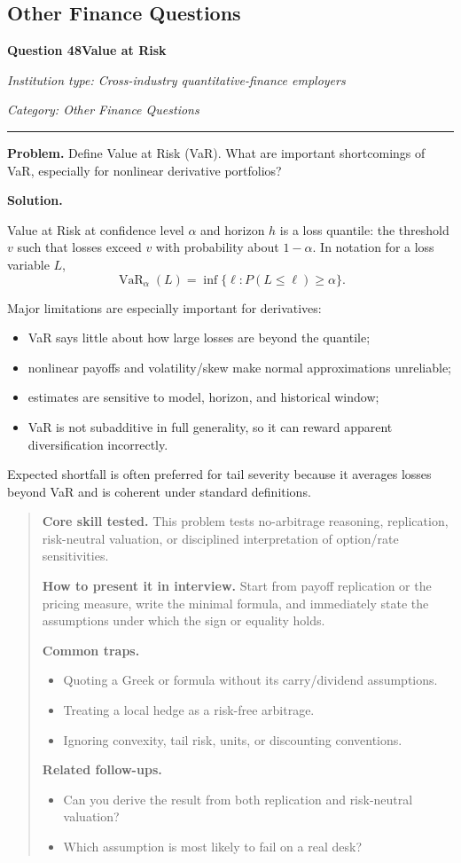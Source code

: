 \documentclass[11pt,letterpaper,openany]{book}
\newenvironment{EditorialNote}
  {\begin{quote}\small\setlength{\parskip}{0.25em}}
  {\end{quote}}
\newcommand{\QuestionSpacer}{\vspace{0.4em}}
\newcommand{\FoundationQuestionHeader}[3]{%
  \vspace{1.0em}%
  {\large\bfseries #1\enspace #2\par}%
  {\small\itshape Institution type: Cross-industry quantitative-finance employers\par}%
  {\small\itshape Category: #3\par}%
  \vspace{0.25em}\hrule\vspace{0.45em}%
}
\begin{document}
\subsection{Other Finance Questions}

\FoundationQuestionHeader{Question 48}{Value at Risk}{Other Finance Questions}

\textbf{Problem.} Define Value at Risk (VaR). What are important shortcomings of VaR, especially for nonlinear derivative portfolios?


\textbf{Solution.}

Value at Risk at confidence level \(\alpha\) and horizon \(h\) is a loss quantile: the threshold \(v\) such that losses exceed \(v\) with probability about \(1-\alpha\). In notation for a loss variable \(L\),
\[
\operatorname{VaR}_\alpha(L)=\inf\{\ell:P(L\le\ell)\ge\alpha\}.
\]

Major limitations are especially important for derivatives:
\begin{itemize}
\item VaR says little about how large losses are beyond the quantile;
\item nonlinear payoffs and volatility/skew make normal approximations unreliable;
\item estimates are sensitive to model, horizon, and historical window;
\item VaR is not subadditive in full generality, so it can reward apparent diversification incorrectly.
\end{itemize}
Expected shortfall is often preferred for tail severity because it averages losses beyond VaR and is coherent under standard definitions.


\begin{EditorialNote}


\textbf{Core skill tested.} This problem tests no-arbitrage reasoning, replication, risk-neutral valuation, or disciplined interpretation of option/rate sensitivities.


\textbf{How to present it in interview.} Start from payoff replication or the pricing measure, write the minimal formula, and immediately state the assumptions under which the sign or equality holds.


\textbf{Common traps.}
\begin{itemize}
\item Quoting a Greek or formula without its carry/dividend assumptions.
\item Treating a local hedge as a risk-free arbitrage.
\item Ignoring convexity, tail risk, units, or discounting conventions.
\end{itemize}


\textbf{Related follow-ups.}
\begin{itemize}
\item Can you derive the result from both replication and risk-neutral valuation?
\item Which assumption is most likely to fail on a real desk?
\end{itemize}


\end{EditorialNote}
\QuestionSpacer
\end{document}
